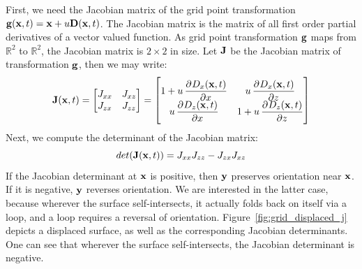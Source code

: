 %
First, we need the Jacobian matrix of the grid point transformation 
$\mathbf{g}(\mathbf{x},t)=\mathbf{x}+u\mathbf{D}(\mathbf{x},t)$. The Jacobian matrix is 
the matrix of all first order partial derivatives of a vector valued function. 
As grid point transformation $\mathbf{g}$ maps from $\mathbb{R}^2$ to 
$\mathbb{R}^2$, the Jacobian matrix is $2\times 2$ in size. Let $\mathbf{J}$ be 
the Jacobian matrix of transformation $\mathbf{g}$, then we may write:
%
\begin{equation}
 \label{eq:jacobian_of_displacement}
 \mvec{J}(\mvec{x},t) =
 \begin{bmatrix}
 J_{xx} & J_{xz} \\
 J_{zx} & J_{zz}
 \end{bmatrix}
 =
 \begin{bmatrix}
   1 + u\dpd{D_x(\mvec{x},t)}{x} & u\dpd{D_x(\mvec{x},t)}{z} \\
   u\dpd{D_z(\mvec{x},t)}{x} & 1 + u\dpd{D_z(\mvec{x},t)}{z}
 \end{bmatrix}
\end{equation}
Next, we compute the determinant of the Jacobian matrix:
\begin{equation}
 det(\mathbf{J}(\mathbf{x},t)) = J_{xx}J_{zz}-J_{zx}J_{xz}
\end{equation}
%
If the Jacobian determinant at $\mathbf{x}$ is positive, then $\mathbf{y}$ 
preserves orientation near $\mathbf{x}$. If it is negative, $\mathbf{y}$ reverses 
orientation. We are interested in the latter case, because wherever the 
surface self-intersects, it actually folds back on itself via a loop, and a 
loop requires a reversal of orientation. Figure~\ref{fig:grid_displaced_j} 
depicts a displaced surface, as well as the corresponding Jacobian 
determinants. One can see that wherever the surface self-intersects, the 
Jacobian determinant is negative.


